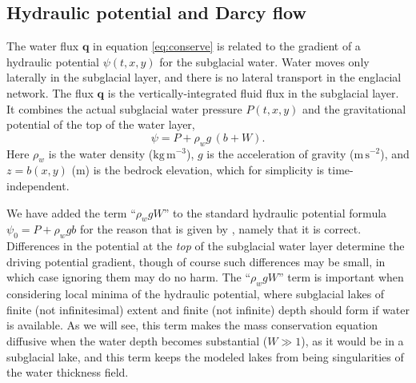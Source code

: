 \documentclass[11pt,final]{amsart}%
\newcommand\bq{\mathbf{q}}
\begin{document}
\subsection*{Hydraulic potential and Darcy flow}  The water flux $\bq$ in equation \eqref{eq:conserve} is related to the gradient of a hydraulic potential $\psi(t,x,y)$ for the subglacial water.  Water moves only laterally in the subglacial layer, and there is no lateral transport in the englacial network.  The flux $\bq$ is the vertically-integrated fluid flux in the subglacial layer.  It combines the actual subglacial water pressure $P(t,x,y)$ and the gravitational potential of the top of the water layer,
\begin{equation} \label{eq:potential}
\psi = P + \rho_w g\, (b+W).
\end{equation}
Here $\rho_w$ is the water density ($\text{kg}\,\text{m}^{-3}$), $g$ is the acceleration of gravity ($\text{m}\,\text{s}^{-2}$), and $z=b(x,y)$ ($\text{m}$) is the bedrock elevation, which for simplicity is time-independent.

We have added the term ``$\rho_w g W$'' to the standard hydraulic potential formula $\psi_0 = P + \rho_w g b$ \citep[for example]{Clarke05} for the reason that is given by \cite{Hewittetal2012}, namely that it is correct.  Differences in the potential at the \emph{top} of the subglacial water layer determine the driving potential gradient, though of course such differences may be small, in which case ignoring them may do no harm.  The  ``$\rho_w g W$'' term is important when considering local minima of the hydraulic potential, where subglacial lakes of finite (not infinitesimal) extent and finite (not infinite) depth should form if water is available.  As we will see, this term makes the mass conservation equation diffusive when the water depth becomes substantial ($W\gg 1$), as it would be in a subglacial lake, and this term keeps the modeled lakes from being singularities of the water thickness field.
\end{document}
